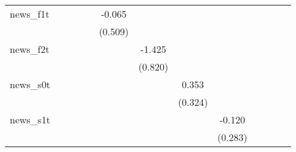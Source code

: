 {\begin{tabular}{l*{12}{c}}
\addlinespace
news\_f1t    &                     &                     &                     &                     &      -0.065         &                     &                     &                     &                     &                     &                     &                     \\
            &                     &                     &                     &                     &     (0.509)         &                     &                     &                     &                     &                     &                     &                     \\
\addlinespace
news\_f2t    &                     &                     &                     &                     &                     &      -1.425\sym{*}  &                     &                     &                     &                     &                     &                     \\
            &                     &                     &                     &                     &                     &     (0.820)         &                     &                     &                     &                     &                     &                     \\
\addlinespace
news\_s0t    &                     &                     &                     &                     &                     &                     &       0.353         &                     &                     &                     &                     &                     \\
            &                     &                     &                     &                     &                     &                     &     (0.324)         &                     &                     &                     &                     &                     \\
\addlinespace
news\_s1t    &                     &                     &                     &                     &                     &                     &                     &      -0.120         &                     &                     &                     &                     \\
            &                     &                     &                     &                     &                     &                     &                     &     (0.283)         &                     &                     &                     &                     \\

\end{tabular}}
